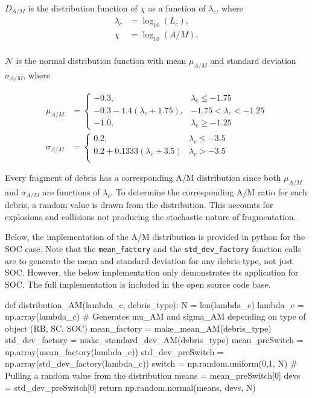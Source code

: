 \documentclass{article}
\newenvironment{code}{\captionsetup{type=listing}}{}
\begin{document}
\noindent $D_{A/M}$ is the distribution function of $\chi$ as a function of $\lambda_c$, where
\begin{align*}
	 \lambda_c &= \log_{10}(L_c),\\
	 \chi &= \log_{10}(A/M),\\
 \end{align*}

\noindent $\mathcal{N}$ is the normal distribution function with mean $\mu_{A/M}$ and standard deviation $\sigma_{A/M}$, where

\begin{align}
	 \mu_{A/M} &= \begin{cases} 
		-0.3, & \lambda_c\leq -1.75 \\
		-0.3 - 1.4(\lambda_c + 1.75), & -1.75 < \lambda_c <-1.25 \\
		-1.0, & \lambda_c \geq -1.25 
	\end{cases}\\
	\sigma_{A/M} &= \begin{cases} 
		0.2, & \lambda_c \leq -3.5 \\
		0.2 + 0.1333(\lambda_c + 3.5) & \lambda_c > -3.5 \\
	\end{cases}
\end{align}

Every fragment of debris has a corresponding A/M distribution since both $\mu_{A/M}$ and $\sigma_{A/M}$ are functions of $\lambda_c$. To determine the corresponding A/M ratio for each debris, a random value is drawn from the distribution. This accounts for explosions and collisions not producing the stochastic nature of fragmentation.

Below, the implementation of the A/M distribution is provided in python for the SOC case. Note that the \texttt{mean_factory}
and the  \texttt{std_dev_factory} function calls are to generate the mean and standard deviation for any debris type, not just SOC. However, the below implementation only demonstrates its application for SOC. The full implementation is included in the open source code base. 

\newpage
 
\begin{code}
	\begin{tcbpythoncode}
		def distribution_AM(lambda_c, debris_type):
		N = len(lambda_c)
		lambda_c = np.array(lambda_c)
		# Generates mu_AM and sigma_AM depending on type of object (RB, SC, SOC)
		mean_factory = make_mean_AM(debris_type)
		std_dev_factory = make_standard_dev_AM(debris_type)
		mean_preSwitch = np.array(mean_factory(lambda_c)) 
		std_dev_preSwitch = np.array(std_dev_factory(lambda_c))
		switch = np.random.uniform(0,1, N)
		# Pulling a random value from the distribution
		means = mean_preSwitch[0]
		devs = std_dev_preSwitch[0]
		return np.random.normal(means, devs, N)
	\end{tcbpythoncode}
\end{code}
\end{document}
